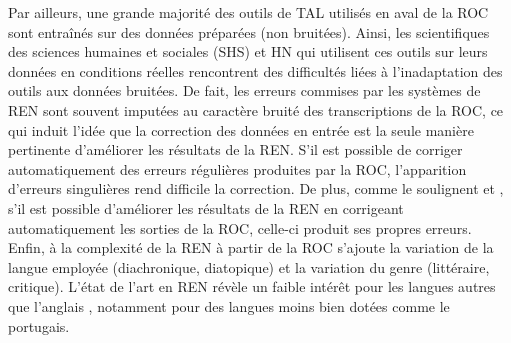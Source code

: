 Par ailleurs, une grande majorité des outils de TAL utilisés en aval de la ROC sont entraînés sur des données préparées (non bruitées). Ainsi, les scientifiques des sciences humaines et sociales (SHS) et HN qui utilisent ces outils sur leurs données en conditions réelles rencontrent des difficultés liées à l'inadaptation des outils aux données bruitées. De fait, les erreurs commises par les systèmes de REN sont souvent imputées au caractère bruité des transcriptions de la ROC, ce qui induit l'idée que la correction des données en entrée est la seule manière pertinente d'améliorer les résultats de la REN. 
S'il est possible de corriger automatiquement des erreurs régulières produites par la ROC, l'apparition d’erreurs singulières rend difficile la correction. De plus, comme le soulignent  et , s'il est possible d'améliorer les résultats de la REN en corrigeant automatiquement les sorties de la ROC, celle-ci produit ses propres erreurs. Enfin, à la complexité de la REN à partir de la ROC s'ajoute la variation de la langue employée (diachronique, diatopique) %
et la variation du genre (littéraire, critique). L'état de l'art en REN révèle un faible intérêt pour les langues autres que l’anglais \cite{lejeune:hal-01294127,rahimi-etal-2019-massively}, notamment pour des langues moins bien dotées comme le portugais.

